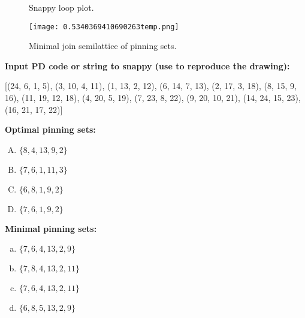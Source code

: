 \documentclass{article}%
\begin{document}
\begin{multicols}{2}
\begin{figure}[H]
\centering

\caption{Snappy loop plot.}
\label{fig:0.06041886984230316temp.svg}
\end{figure}\columnbreak

\begin{figure}[H]
\centering
\texttt{[image: 0.5340369410690263temp.png]}
\caption{Minimal join semilattice of pinning sets.}
\label{fig:0.5340369410690263temp.png}
\end{figure}\end{multicols}\newpage\begin{multicols}{2}

\columnbreak

\noindent\textbf{Input PD code or string to snappy (use to reproduce the drawing):}

	[(24, 6, 1, 5), (3, 10, 4, 11), (1, 13, 2, 12), (6, 14, 7, 13), (2, 17, 3, 18), (8, 15, 9, 16), (11, 19, 12, 18), (4, 20, 5, 19), (7, 23, 8, 22), (9, 20, 10, 21), (14, 24, 15, 23), (16, 21, 17, 22)]

\noindent\textbf{Optimal pinning sets:}

\begin{enumerate}[A)]
\item{\Huge\textcolor{green0}{\textbullet}}$\{8,4,13,9,2\}$

\item{\Huge\textcolor{green1}{\textbullet}}$\{7,6,1,11,3\}$

\item{\Huge\textcolor{green2}{\textbullet}}$\{6,8,1,9,2\}$

\item{\Huge\textcolor{green3}{\textbullet}}$\{7,6,1,9,2\}$

\end{enumerate}
\textbf{Minimal pinning sets:}

\begin{enumerate}[a)]
\item{\Huge\textcolor{blue0}{\textbullet}}$\{7,6,4,13,2,9\}$

\item{\Huge\textcolor{blue1}{\textbullet}}$\{7,8,4,13,2,11\}$

\item{\Huge\textcolor{blue2}{\textbullet}}$\{7,6,4,13,2,11\}$

\item{\Huge\textcolor{blue3}{\textbullet}}$\{6,8,5,13,2,9\}$


\end{enumerate}
\end{multicols}
\end{document}
